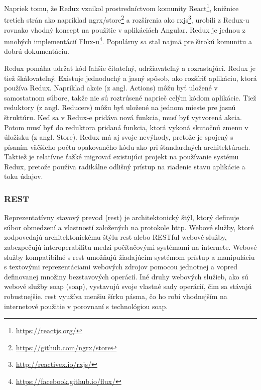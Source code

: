 Napriek tomu, že Redux vznikol prostredníctvom komunity React\footnote{\url{https://reactjs.org/}},
knižnice tretích strán ako napríklad ngrx/store\footnote{\url{https://github.com/ngrx/store}}
a rozšírenia ako \acrshort{rxjs}\footnote{\url{http://reactivex.io/rxjs/}}, urobili z Redux-u
rovnako vhodný koncept na použitie v aplikáciách Angular. Redux je jednou z mnohých
implementácií Flux-u\footnote{\url{https://facebook.github.io/flux/}}.
Populárny sa stal najmä pre širokú komunitu a dobrú dokumentáciu.

Redux pomáha udržať kód ľahšie čitateľný, udržiavateľný a rozrastajúci. Redux je tiež
škálovateľný. Existuje jednoduchý a jasný spôsob, ako rozšíriť aplikáciu, ktorá používa
Redux. Napríklad akcie (z angl. Actions) môžu byť uložené v samostatnom súbore, takže nie sú roztrúsené
naprieč celým kódom aplikácie. Tiež reduktory (z angl. Reducers) môžu byť uložené na jednom mieste
pre jasnú štruktúru. Keď sa v Redux-e pridáva nová funkcia, musí byť vytvorená
akcia. Potom musí byť do reduktora pridaná funkcia, ktorá vykoná skutočnú zmenu
v úložisku (z angl. Store). Redux má aj svoje nevýhody, pretože je spojený s písaním väčšieho počtu
opakovaného kódu ako pri štandardných architektúrach. Taktiež je relatívne ťažké migrovať
existujúci projekt na používanie systému Redux, pretože používa radikálne odlišný prístup
na riadenie stavu aplikácie a toku údajov.

\subsubsection{REST}
\label{subsubsec:rest}

Reprezentatívny stavový  prevod (\acrshort{rest}) je architektonický štýl, ktorý definuje súbor
obmedzení a vlastností založených na protokole \acrshort{http}. Webové služby, ktoré zodpovedajú
architektonickému štýlu \acrshort{rest} alebo RESTful webové služby, zabezpečujú interoperabilitu
medzi počítačovými systémami na internete. Webové služby kompatibilné s \acrshort{rest} umožňujú
žiadajúcim systémom prístup a manipuláciu s textovými reprezentáciami webových zdrojov
pomocou jednotnej a vopred definovanej množiny bezstavových operácií. Iné druhy webových
služieb, ako sú webové služby \acrshort{soap} (\acrlong{soap}), vystavujú svoje vlastné
sady operácií, čim sa stávajú robustnejšie. \acrshort{rest} využíva menšiu šírku pásma, čo ho robí
vhodnejším na internetové použitie v porovnaní s technológiou \acrshort{soap}.

